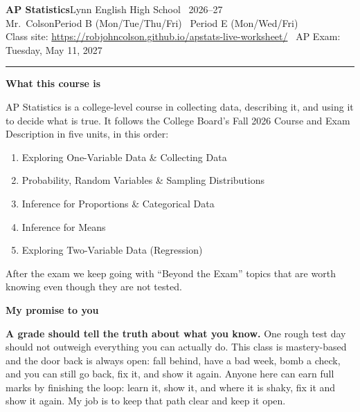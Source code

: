 \documentclass[10pt]{article}
\newcommand{\banner}[1]{%
  \vspace{4pt}\begin{tcolorbox}[enhanced, boxrule=0pt, arc=1pt, colback=dayblue, left=6pt, right=6pt, top=3pt, bottom=3pt]
  {\color{white}\bfseries\large #1}\end{tcolorbox}\vspace{-2pt}}
\begin{document}
{\LARGE\bfseries AP Statistics}\hfill{\large Lynn English High School \textperiodcentered\ 2026--27}\\
{\large Mr.~Colson}\hfill{\small Period B (Mon/Tue/Thu/Fri) \textperiodcentered\ Period E (Mon/Wed/Fri)}\\
{\small Class site: \url{https://robjohncolson.github.io/apstats-live-worksheet/} \textperiodcentered\ AP Exam: Tuesday, May 11, 2027}
\vspace{2pt}\hrule

\banner{What this course is}
AP Statistics is a college-level course in collecting data, describing it, and using it to decide what is true.
It follows the College Board's Fall 2026 Course and Exam Description in five units, in this order:

\begin{enumerate}[leftmargin=1.6em, itemsep=1pt, topsep=2pt]
  \item Exploring One-Variable Data \& Collecting Data
  \item Probability, Random Variables \& Sampling Distributions
  \item Inference for Proportions \& Categorical Data
  \item Inference for Means
  \item Exploring Two-Variable Data (Regression)
\end{enumerate}
After the exam we keep going with ``Beyond the Exam'' topics that are worth knowing even though they are not tested.

\banner{My promise to you}
\begin{tcolorbox}[enhanced, colback=callout, colframe=dayblue, boxrule=0.6pt, arc=2pt, left=7pt, right=7pt, top=4pt, bottom=4pt]
\textbf{A grade should tell the truth about what you know.} One rough test day should not outweigh everything you can
actually do. This class is mastery-based and the door back is always open: fall behind, have a bad week, bomb a check,
and you can still go back, fix it, and show it again. Anyone here can earn full marks by finishing the loop: learn it, show
it, and where it is shaky, fix it and show it again. My job is to keep that path clear and keep it open.
\end{tcolorbox}
\end{document}
